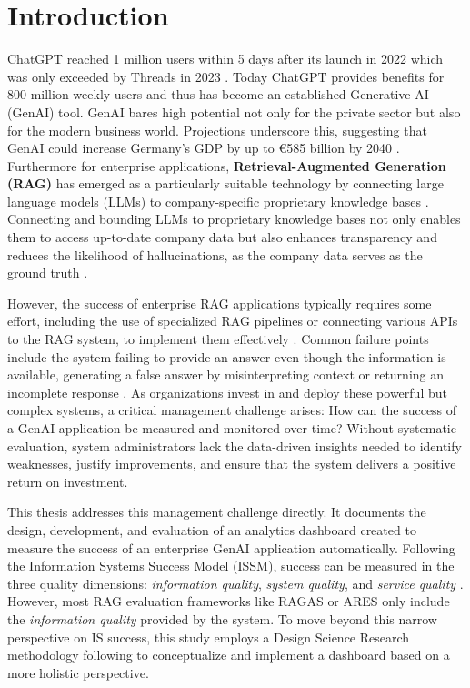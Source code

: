 \documentclass[
	english,
	ruledheaders=section,%
	class=report,%
	thesis={type=bachelor},%
	accentcolor=1b,%
	custommargins=true,%
	marginpar=false,%
	parskip=half-,%
	fontsize=11pt,%
	DIV=14,
]{tudapub}
\begin{document}
\chapter{Introduction}
ChatGPT reached 1 million users within 5 days after its launch in 2022 which was only exceeded by Threads in 2023 \parencite{Brandt2023}. Today ChatGPT provides benefits for 800 million weekly users \parencite{Huber2025} and thus has become an established Generative AI (GenAI) tool. GenAI bares high potential not only for the private sector but also for the modern business world. Projections underscore this, suggesting that GenAI could increase Germany's GDP by up to €585 billion by 2040 \parencite[p.~12]{McKinsey2023}. Furthermore for enterprise applications, \textbf{Retrieval-Augmented Generation (RAG)} has emerged as a particularly suitable technology by connecting large language models (LLMs) to company-specific proprietary knowledge bases  \parencite[p.~9459]{Lewis2020}. Connecting and bounding LLMs to proprietary knowledge bases not only enables them to access up-to-date company data \parencite{GoogleCloudRAG} but also enhances transparency and reduces the likelihood of hallucinations, as the company data serves as the ground truth  \parencite[p.~9469]{Lewis2020}.

However, the success of enterprise RAG applications typically requires some effort, including the use of specialized RAG pipelines or connecting various APIs to the RAG system, to implement them effectively \parencite[pp.~5--7]{Bruckhaus2024RAG}. Common failure points include the system failing to provide an answer even though the information is available, generating a false answer by misinterpreting context or returning an incomplete response \parencite[p.~91]{Barnett2024}. As organizations invest in and deploy these powerful but complex systems, a critical management challenge arises: How can the success of a GenAI application be measured and monitored over time? Without systematic evaluation, system administrators lack the data-driven insights needed to identify weaknesses, justify improvements, and ensure that the system delivers a positive return on investment.

This thesis addresses this management challenge directly. It documents the design, development, and evaluation of an analytics dashboard created to measure the success of an enterprise GenAI application automatically. Following the Information Systems Success Model (ISSM), success can be measured in the three quality dimensions: \textit{information quality}, \textit{system quality}, and \textit{service quality} \parencite[pp.~23--24]{DeloneMcLean2003ISSuccessTenYearUpdate}. However, most RAG evaluation frameworks like RAGAS \parencite{Es2024} or ARES \parencite{Saad-Falcon2024} only include the \textit{information quality} provided by the system. To move beyond this narrow perspective on IS success, this study employs a Design Science Research methodology following \cite{Peffers2007} to conceptualize and implement a dashboard based on a more holistic perspective.
\end{document}
